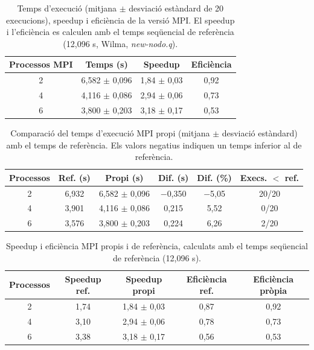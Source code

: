 \begin{table}[H]
\centering
\begin{tabular}{|c|c|c|c|}
\hline
\textbf{Processos MPI} & \textbf{Temps (s)} & \textbf{Speedup} & \textbf{Eficiència} \\ \hline
2 & 6,582 $\pm$ 0,096 & 1,84 $\pm$ 0,03 & 0,92 \\ \hline
4 & 4,116 $\pm$ 0,086 & 2,94 $\pm$ 0,06 & 0,73 \\ \hline
6 & 3,800 $\pm$ 0,203 & 3,18 $\pm$ 0,17 & 0,53 \\ \hline
\end{tabular}
\caption{Temps d'execució (mitjana $\pm$ desviació estàndard de 20 execucions), speedup i eficiència de la versió MPI. El speedup i l'eficiència es calculen amb el temps seqüencial de referència (12,096 s, Wilma, \textit{new-nodo.q}).}
\label{tab:mpi_resultats}
\end{table}

\begin{table}[H]
\centering
\begin{tabular}{|c|c|c|c|c|c|}
\hline
\textbf{Processos} & \textbf{Ref. (s)} & \textbf{Propi (s)} & \textbf{Dif. (s)} & \textbf{Dif. (\%)} & \textbf{Execs. $<$ ref.} \\ \hline
2 & 6,932 & 6,582 $\pm$ 0,096 & $-$0,350 & $-$5,05 & 20/20 \\ \hline
4 & 3,901 & 4,116 $\pm$ 0,086 & 0,215 & 5,52 & 0/20 \\ \hline
6 & 3,576 & 3,800 $\pm$ 0,203 & 0,224 & 6,26 & 2/20 \\ \hline
\end{tabular}
\caption{Comparació del temps d'execució MPI propi (mitjana $\pm$ desviació estàndard) amb el temps de referència. Els valors negatius indiquen un temps inferior al de referència.}
\label{tab:mpi_comp_temps}
\end{table}

\begin{table}[H]
\centering
\begin{tabular}{|c|c|c|c|c|}
\hline
\textbf{Processos} & \textbf{Speedup ref.} & \textbf{Speedup propi} & \textbf{Eficiència ref.} & \textbf{Eficiència pròpia} \\ \hline
2 & 1,74 & 1,84 $\pm$ 0,03 & 0,87 & 0,92 \\ \hline
4 & 3,10 & 2,94 $\pm$ 0,06 & 0,78 & 0,73 \\ \hline
6 & 3,38 & 3,18 $\pm$ 0,17 & 0,56 & 0,53 \\ \hline
\end{tabular}
\caption{Speedup i eficiència MPI propis i de referència, calculats amb el temps seqüencial de referència (12,096 s).}
\label{tab:mpi_comp_speedup}
\end{table}
